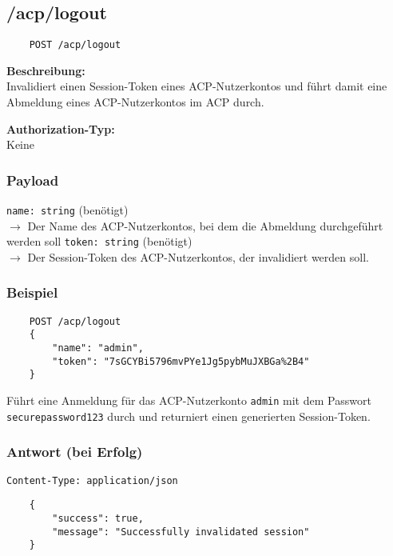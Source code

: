 \subsection{/acp/logout}

\begin{lstlisting}
    POST /acp/logout
\end{lstlisting}

\textbf{Beschreibung:} \\
Invalidiert einen Session-Token eines ACP-Nutzerkontos und führt damit eine Abmeldung eines ACP-Nutzerkontos im ACP durch.

\textbf{Authorization-Typ:} \\
Keine

\subsubsection{Payload}

\lstinline{name: string} (benötigt) \\
$\rightarrow$ Der Name des ACP-Nutzerkontos, bei dem die Abmeldung durchgeführt werden soll
\lstinline{token: string} (benötigt) \\
$\rightarrow$ Der Session-Token des ACP-Nutzerkontos, der invalidiert werden soll.

\subsubsection{Beispiel}

\begin{lstlisting}
    POST /acp/logout
    {
        "name": "admin",
        "token": "7sGCYBi5796mvPYe1Jg5pybMuJXBGa%2B4"
    }
\end{lstlisting}

Führt eine Anmeldung für das ACP-Nutzerkonto \lstinline{admin} mit dem Passwort \lstinline{securepassword123} durch und returniert einen generierten Session-Token.

\subsubsection{Antwort (bei Erfolg)}

\lstinline{Content-Type: application/json}
\begin{lstlisting}
    {
        "success": true, 
        "message": "Successfully invalidated session"
    }
\end{lstlisting}
